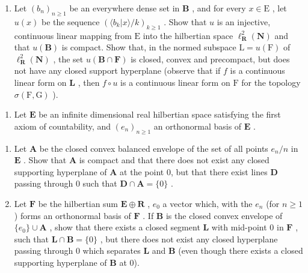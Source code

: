 \begin{enumerate}
\def\labelenumi{\alph{enumi})}
\setcounter{enumi}{1}
\tightlist
\item
  Let \((b_n)_{n\geqslant 1}\) be an everywhere dense set in \(\mathbf{B}\) , and for every \(x\in \mathrm{E}\) , let \(u(x)\) be the sequence \((\langle b_k|x\rangle /k)_{k\geqslant 1}\) . Show that \(u\) is an injective, continuous linear mapping from \(\mathrm{E}\) into the hilbertian space \(\ell_{\mathbf{R}}^2 (\mathbf{N})\) and that \(u(\mathbf{B})\) is compact. Show that, in the normed subspace \(\mathrm{L} = u(\mathrm{F})\) of \(\ell_{\mathbf{R}}^2 (\mathbf{N})\) , the set \(u(\mathbf{B}\cap \mathbf{F})\) is closed, convex and precompact, but does not have any closed support hyperplane (observe that if \(f\) is a continuous linear form on \(\mathbf{L}\) , then \(f\circ u\) is a continuous linear form on \(\mathrm{F}\) for the topology \(\sigma (\mathrm{F},\mathrm{G})\) ).
\end{enumerate}

\begin{enumerate}
\def\labelenumi{\arabic{enumi})}
\setcounter{enumi}{9}
\tightlist
\item
  Let \(\mathbf{E}\) be an infinite dimensional real hilbertian space satisfying the first axiom of countability, and \((e_n)_{n\geqslant 1}\) an orthonormal basis of \(\mathbf{E}\) .
\end{enumerate}

\begin{enumerate}
\def\labelenumi{\alph{enumi})}
\item
  Let \(\mathbf{A}\) be the closed convex balanced envelope of the set of all points \(e_n / n\) in \(\mathbf{E}\) . Show that \(\mathbf{A}\) is compact and that there does not exist any closed supporting hyperplane of \(\mathbf{A}\) at the point 0, but that there exist lines \(\mathbf{D}\) passing through 0 such that \(\mathbf{D} \cap \mathbf{A} = \{0\}\) .
\item
  Let \(\mathbf{F}\) be the hilbertian sum \(\mathbf{E} \oplus \mathbf{R}\) , \(e_0\) a vector which, with the \(e_n\) (for \(n \geqslant 1\) ) forms an orthonormal basis of \(\mathbf{F}\) . If \(\mathbf{B}\) is the closed convex envelope of \(\{e_0\} \cup \mathbf{A}\) , show that there exists a closed segment \(\mathbf{L}\) with mid-point 0 in \(\mathbf{F}\) , such that \(\mathbf{L} \cap \mathbf{B} = \{0\}\) , but there does not exist any closed hyperplane passing through 0 which separates \(\mathbf{L}\) and \(\mathbf{B}\) (even though there exists a closed supporting hyperplane of \(\mathbf{B}\) at 0).
\end{enumerate}

